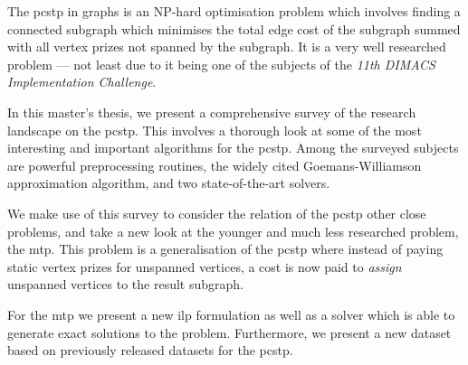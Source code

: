 The \gls{pcstp} in graphs is an NP-hard optimisation problem which involves
finding a connected subgraph which minimises the total edge cost of
the subgraph summed with all vertex prizes not spanned by the subgraph.
It is a very well researched problem --- not least due to it being one of the
subjects of the \textit{11th DIMACS Implementation Challenge}.

In this master's thesis, we present a comprehensive survey of the research landscape
on the \gls{pcstp}. This involves a thorough look at some of the most interesting
and important algorithms for the \gls{pcstp}. Among the surveyed subjects are
powerful preprocessing routines, the widely cited Goemans-Williamson approximation
algorithm, and two state-of-the-art solvers.

We make use of this survey to consider the relation of the \gls{pcstp} other close
 problems, and take a new look at the younger and much less researched problem, the
\gls{mtp}. This problem is a generalisation of the \gls{pcstp} where instead of paying
static vertex prizes for unspanned vertices, a cost is now paid to \textit{assign}
unspanned vertices to the result subgraph.

For the \gls{mtp} we present a new \acrlong{ilp} formulation as well as a solver which
is able to generate exact solutions to the problem. Furthermore, we present a new
dataset based on previously released datasets for the \gls{pcstp}.

